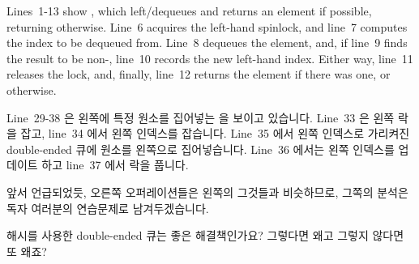 Lines~1-13 show , which left\-/dequeues and returns
an element if possible, returning  otherwise.
Line~6 acquires the left-hand spinlock, and line~7 computes the
index to be dequeued from.
Line~8 dequeues the element, and, if line~9 finds the result to be
non-, line~10 records the new left-hand index.
Either way, line~11 releases the lock, and, finally, line~12 returns
the element if there was one, or  otherwise.
\fi

Line~29-38 은 왼쪽에 특정 원소를 집어넣는  을 보이고
있습니다.
Line~33 은 왼쪽 락을 잡고, line~34 에서 왼쪽 인덱스를 잡습니다.
Line~35 에서 왼쪽 인덱스로 가리켜진 double-ended 큐에 원소를 왼쪽으로
집어넣습니다.
Line~36 에서는 왼쪽 인덱스를 업데이트 하고 line~37 에서 락을 풉니다.

앞서 언급되었듯, 오른쪽 오퍼레이션들은 왼쪽의 그것들과 비슷하므로, 그쪽의
분석은 독자 여러분의 연습문제로 남겨두겠습니다.

\QuickQuiz{}
	해시를 사용한 double-ended 큐는 좋은 해결책인가요?
	그렇다면 왜고 그렇지 않다면 또 왜죠?
	\iffalse

